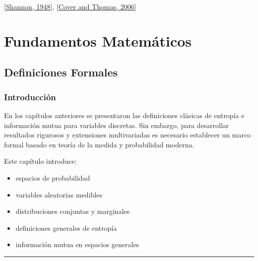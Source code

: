 \documentclass[letterpaper,10pt,english]{jupyterBook}
\begin{document}
\sphinxAtStartPar
{[}\hyperlink{cite.05_appendices/references:id6}{Shannon, 1948}{]}, {[}\hyperlink{cite.05_appendices/references:id2}{Cover and Thomas, 2006}{]}

\sphinxstepscope


\part{Fundamentos Matemáticos}

\sphinxstepscope


\chapter{Definiciones Formales}
\label{\detokenize{02_mathematical_foundations/formal_definitions:definiciones-formales}}\label{\detokenize{02_mathematical_foundations/formal_definitions::doc}}

\section{Introducción}
\label{\detokenize{02_mathematical_foundations/formal_definitions:introduccion}}
\sphinxAtStartPar
En los capítulos anteriores se presentaron las definiciones clásicas
de entropía e información mutua para variables discretas. Sin embargo,
para desarrollar resultados rigurosos y extensiones multivariadas es
necesario establecer un marco formal basado en teoría de la medida
y probabilidad moderna.

\sphinxAtStartPar
Este capítulo introduce:
\begin{itemize}
\item {} 
\sphinxAtStartPar
espacios de probabilidad

\item {} 
\sphinxAtStartPar
variables aleatorias medibles

\item {} 
\sphinxAtStartPar
distribuciones conjuntas y marginales

\item {} 
\sphinxAtStartPar
definiciones generales de entropía

\item {} 
\sphinxAtStartPar
información mutua en espacios generales

\end{itemize}


\bigskip\hrule\bigskip
\end{document}
